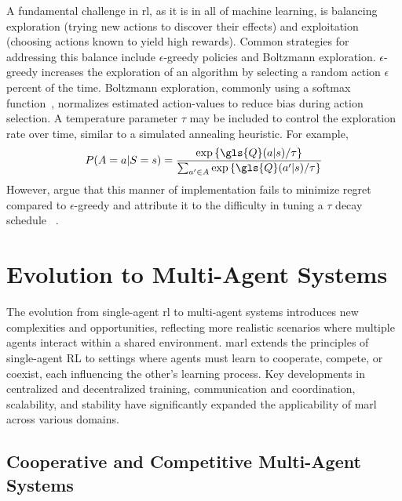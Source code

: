 A fundamental challenge in \gls{rl}, as it is in all of machine learning, 
is balancing exploration (trying new actions to discover their effects) 
and exploitation (choosing actions known to yield high rewards). 
Common strategies for addressing this balance include \(\epsilon\)-greedy 
policies and Boltzmann exploration.
\(\epsilon\)-greedy increases the exploration of an algorithm by selecting
a random action \(\epsilon\) percent of the time.
%
Boltzmann exploration, commonly using a softmax function~\cite{pan2021}, 
normalizes estimated action-values to reduce bias during action selection. 
A temperature parameter \(\tau\) may be included to control the exploration 
rate over time, similar to a simulated annealing heuristic. 
For example,
%
\begin{equation}
    P(A=a|S=s) =
    \frac{\exp\left\{\gls{Q}(a|s)/\tau\right\}}{
        \sum_{a^\prime\in A}\exp\left\{\gls{Q}(a^\prime|s)/\tau\right\}}
    \label{eq:softmax_action-value}
\end{equation}
However, \cite{cesa-bianchi2017} argue that this manner of 
implementation fails to minimize regret compared to \(\epsilon\)-greedy 
and attribute it to the difficulty in tuning a \(\tau\) decay schedule~
\cite{kaelbling1996,vermorel2005}.

\section{Evolution to Multi-Agent Systems}%

The evolution from single-agent \gls{rl} to multi-agent systems introduces new 
complexities and opportunities, reflecting more realistic scenarios where 
multiple agents interact within a shared environment. \Gls{marl} extends the 
principles of single-agent RL to settings where agents must learn to 
cooperate, compete, or coexist, each influencing the other's learning process.
Key developments in centralized and decentralized training, communication and 
coordination, scalability, and stability have significantly expanded the 
applicability of \gls{marl} across various domains. 

    \subsection*{Cooperative and Competitive Multi-Agent Systems}%

